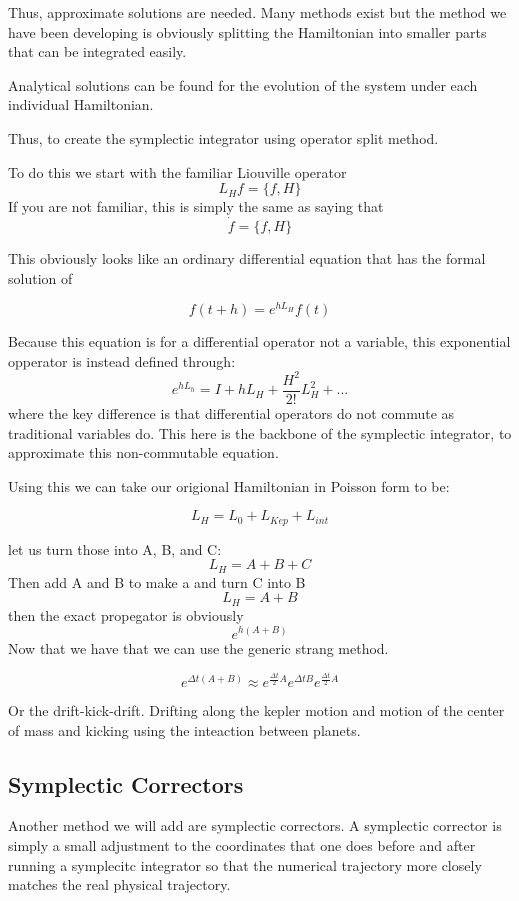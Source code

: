   Thus, approximate solutions are needed. Many methods exist but the method we have been developing is obviously splitting the Hamiltonian into smaller parts that can be integrated easily.

  Analytical solutions can be found for the evolution of the system under each individual Hamiltonian.


  Thus, to create the symplectic integrator using operator split method.

  To do this we start with the familiar Liouville operator
\[
L_H f = \{f, H\}
  \]
  If you are not familiar, this is simply the same as saying that
\[
\dot{f} = \{f,H \}
  \]

  This obviously looks like an ordinary differential equation that has the formal solution of

\[
f(t+h) = e^{h L_H}f(t)
  \]

  Because this equation is for a differential operator not a variable, this exponential opperator is instead defined through:
\[
e^{hL_h} = I + hL_H + \frac{H^2}{2!}L^2_H + ...
  \]
  where the key difference is that differential operators do not commute as traditional variables do. This here is the backbone of the symplectic integrator, to approximate this non-commutable equation.

  Using this we can take our origional Hamiltonian in Poisson form to be:

\[
L_H = L_0 + L_{Kep} + L_{int}
\]

let us turn those into A, B, and C:
\[
L_H = A + B + C
\]
Then add A and B to make a and turn C into B
\[
L_H = A + B
\]
then the exact propegator is obviously
\[
e^{h(A+B)}
\]
Now that we have that we can use the generic strang method.

\[
\boxed{
e^{\Delta t(A+B)}
\approx
e^{\frac{\Delta t}{2}A}
e^{\Delta t B}
e^{\frac{\Delta t}{2}A}
}
\]

Or the drift-kick-drift. Drifting along the kepler motion and motion of the center of mass and kicking using the inteaction between planets.

\subsection{Symplectic Correctors}

Another method we will add are symplectic correctors. A symplectic corrector is simply a small adjustment to the coordinates that one does before and after running a symplecitc integrator so that the numerical trajectory more closely matches the real physical trajectory.

